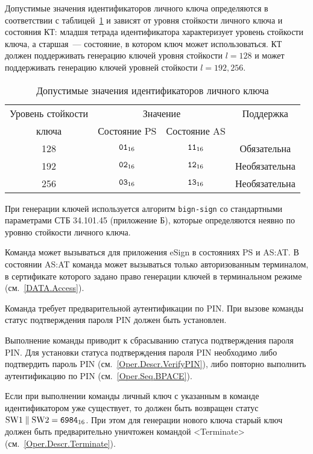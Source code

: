 Допустимые значения идентификаторов личного ключа определяются
в соответствии с таблицей~\ref{Table.Oper.KeyRef} и зависят от
уровня стойкости личного ключа и состояния КТ:
младшя тетрада идентификатора характеризует уровень стойкости ключа,
а старшая~--- состояние, в котором ключ может использоваться.
КТ должен поддерживать генерацию ключей уровня стойкости 
$l=128$ и может поддерживать генерацию ключей 
уровней стойкости $l=192, 256$.

\begin{table}[hbt]
\caption{Допустимые значения идентификаторов личного ключа}
\label{Table.Oper.KeyRef}
\begin{tabular}{|c|c|c|c|}
\hline
Уровень стойкости & \multicolumn{2}{|c|}{Значение } & Поддержка\\
\cline{2-3}
ключа & Состояние PS & Состояние AS & \\
\hline
\hline
128 & $\texttt{01}_{16}$ & $\texttt{11}_{16}$ & Обязательна \\
192 & $\texttt{02}_{16}$ & $\texttt{12}_{16}$ & Необязательна\\
256 & $\texttt{03}_{16}$ & $\texttt{13}_{16}$ & Необязательна\\
\hline
\end{tabular}
\end{table}

При генерации ключей используется алгоритм \texttt{bign-sign}
со стандартными параметрами СТБ 34.101.45 (приложение Б), 
которые определяются неявно по уровню стойкости личного ключа. 

Команда может вызываться для приложения eSign в состояниях 
PS и AS:AT. В состоянии AS:AT команда может вызываться 
только авторизованным терминалом, в сертификате которого задано право
генерации ключей в терминальном режиме (см.~\ref{DATA.Access}).

Команда требует предварительной аутентификации по PIN. При вызове
команды статус подтверждения пароля PIN должен быть 
установлен.

Выполнение команды приводит к сбрасыванию статуса подтверждения пароля PIN.
Для установки статуса подтверждения пароля PIN 
необходимо либо подтвердить пароль PIN (см.~\ref{Oper.Descr.VerifyPIN}), 
либо повторно выполнить аутентификацию по PIN (см.~\ref{Oper.Seq.BPACE}).

Если при выполнении команды личный ключ с указанным в команде идентификатором
уже существует, то должен быть возвращен статус 
$\text{SW1} \parallel \text{SW2} = \texttt{6984}_{16}$. 
При этом для генерации нового ключа старый ключ должен быть предварительно 
уничтожен командой <Terminate> (см.~\ref{Oper.Descr.Terminate}).


